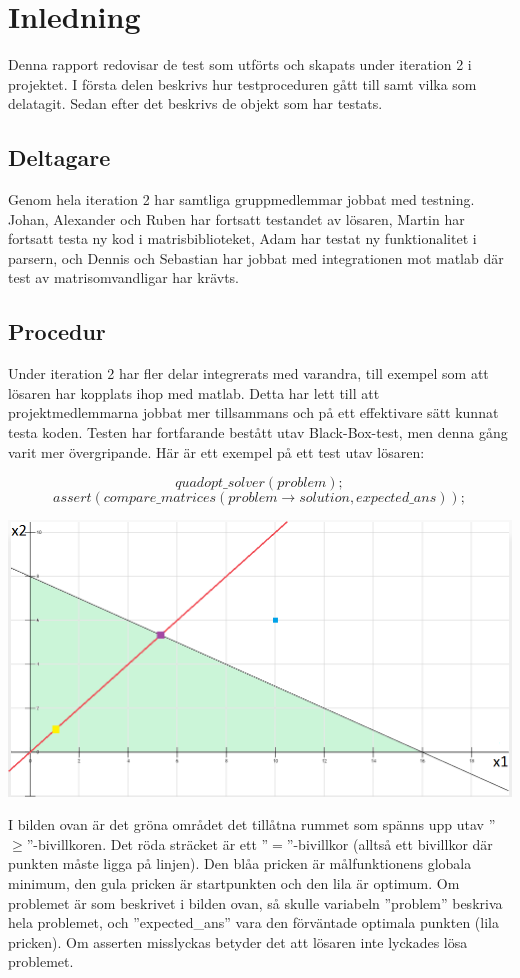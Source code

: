 \section{Inledning}
Denna rapport redovisar de test som utförts och skapats under iteration 2 i projektet. I första delen beskrivs hur testproceduren gått till samt vilka som delatagit. Sedan efter det beskrivs de objekt som har testats.
\subsection{Deltagare}
Genom hela iteration 2 har samtliga gruppmedlemmar jobbat med testning. Johan, Alexander och Ruben har fortsatt testandet av lösaren, Martin har fortsatt testa ny kod i matrisbiblioteket, Adam har testat ny funktionalitet i parsern, och Dennis och Sebastian har jobbat med integrationen mot matlab där test av matrisomvandligar har krävts. 

\subsection{Procedur}
Under iteration 2 har fler delar integrerats med varandra, till exempel som att lösaren har kopplats ihop med matlab. Detta har lett till att projektmedlemmarna jobbat mer tillsammans och på ett effektivare sätt kunnat testa koden. Testen har fortfarande bestått utav Black-Box-test, men denna gång varit mer övergripande. Här är ett exempel på ett test utav lösaren:

$$quadopt\_solver(problem);$$
$$assert(compare\_matrices(problem\rightarrow solution, expected\_ans));$$

\includegraphics[scale=0.6]{grafik/prob.png}


\raggedright I bilden ovan är det gröna området det tillåtna rummet som spänns upp utav ''$\geq$''-bivillkoren. Det röda sträcket är ett ''$=$''-bivillkor (alltså ett bivillkor där punkten måste ligga på linjen). Den blåa pricken är målfunktionens globala minimum, den gula pricken är startpunkten och den lila är optimum. \newline
Om problemet är som beskrivet i bilden ovan, så skulle variabeln ''problem'' beskriva hela problemet, och ''expected\_ans'' vara den förväntade optimala punkten (lila pricken). Om asserten misslyckas betyder det att lösaren inte lyckades lösa problemet.

